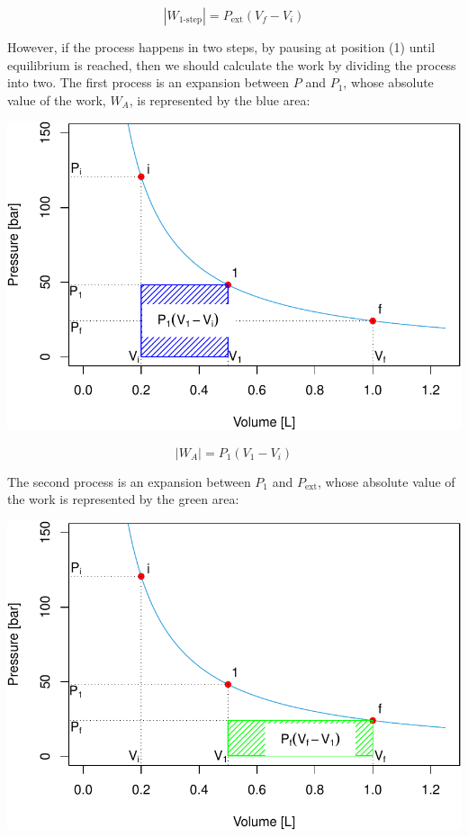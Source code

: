 \documentclass[
]{book}
\theoremstyle{definition}
\theoremstyle{definition}
\theoremstyle{definition}
\theoremstyle{remark}
\begin{document}
\begin{equation}
\left| W_{\text{1-step}} \right| = P_{\text{ext}} (V_f-V_i)
  \label{eq:Warea1}
\end{equation}

However, if the process happens in two steps, by pausing at position (1) until equilibrium is reached, then we should calculate the work by dividing the process into two. The first process is an expansion between \(P\) and \(P_1\), whose absolute value of the work, \(W_A\), is represented by the blue area:

\begin{center}\includegraphics{pchem1_files/figure-latex/unnamed-chunk-4-1} \end{center}

\begin{equation}
\left| W_A \right| = P_1 (V_1-V_i)
  \label{eq:Warea2}
\end{equation}

The second process is an expansion between \(P_1\) and \(P_{\text{ext}}\), whose absolute value of the work is represented by the green area:

\begin{center}\includegraphics{pchem1_files/figure-latex/unnamed-chunk-5-1} \end{center}
\end{document}
